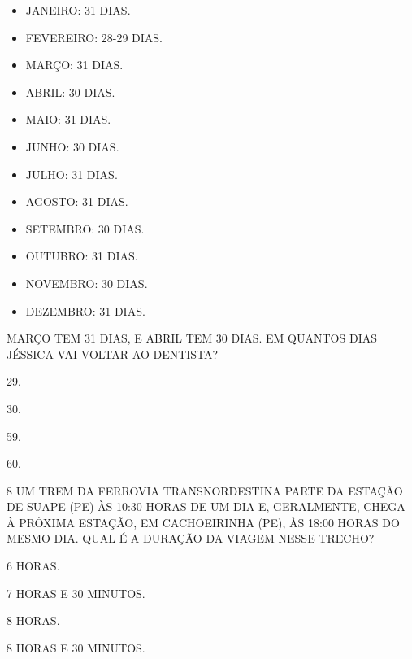 \begin{myquote}
\begin{multicols}{2}
\begin{itemize}[itemsep=12pt]
  \item JANEIRO: 31 DIAS.
  \item FEVEREIRO: 28-29 DIAS.
  \item MARÇO: 31 DIAS.
  \item ABRIL: 30 DIAS.
  \item MAIO: 31 DIAS.
  \item JUNHO: 30 DIAS.
\columnbreak
  \item JULHO: 31 DIAS.
  \item AGOSTO: 31 DIAS.
  \item SETEMBRO: 30 DIAS.
  \item OUTUBRO: 31 DIAS.
  \item NOVEMBRO: 30 DIAS.
  \item DEZEMBRO: 31 DIAS.
\end{itemize}
\end{multicols}
\end{myquote}

MARÇO TEM 31 DIAS, E ABRIL TEM 30 DIAS. EM QUANTOS DIAS JÉSSICA VAI VOLTAR AO DENTISTA?

\begin{multicols}{2}
\begin{escolha}
\item 29.

\item 30.

\item 59.

\item 60.
\end{escolha}
\end{multicols}

\num{8} UM TREM DA FERROVIA TRANSNORDESTINA PARTE DA ESTAÇÃO DE SUAPE (PE) ÀS 10:30 
HORAS DE UM DIA E, GERALMENTE, CHEGA À PRÓXIMA ESTAÇÃO, EM CACHOEIRINHA (PE), ÀS 
18:00 HORAS DO MESMO DIA. QUAL É A DURAÇÃO DA VIAGEM NESSE TRECHO?

\begin{escolha}
\item 6 HORAS.

\item 7 HORAS E 30 MINUTOS.

\item 8 HORAS.

\item 8 HORAS E 30 MINUTOS.
\end{escolha}

